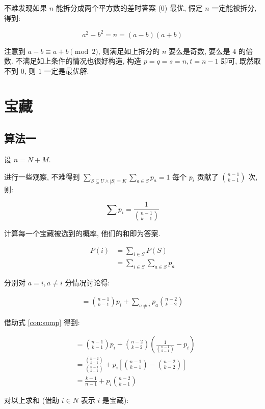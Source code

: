 \documentclass[a4paper, 12pt]{ctexart}
\begin{document}
不难发现如果 $n$ 能拆分成两个平方数的差时答案 ($0$) 最优, 假定 $n$ 一定能被拆分, 得到:

$$
a^2 - b^2 = n = (a - b)(a + b)
$$

注意到 $a - b \equiv a + b \pmod 2$, 则满足如上拆分的 $n$ 要么是奇数, 要么是 $4$ 的倍数.
不满足如上条件的情况也很好构造, 构造 $p = q = s = n, t = n - 1$ 即可, 既然取不到 $0$, 则 $1$ 一定是最优解.

\section{宝藏}

\subsection{算法一}

设 $n = N + M$.

进行一些观察, 不难得到 $\sum_{S \subseteq U \wedge |S| = K}\sum_{a\in S }p_a=1$ 每个 $p_i$ 贡献了 $\binom{n - 1}{k - 1}$ 次, 则:

\begin{equation}
    \sum p_i = \frac{1}{\binom{n - 1}{k - 1}} \label{con:sump}
\end{equation}

计算每一个宝藏被选到的概率, 他们的和即为答案.

\begin{align}
    P(i) &= \sum_{i \in S} P(S) \\
    &= \sum_{i \in S} \sum_{a \in S} p_a
\end{align}

分别对 $a = i, a \neq i$ 分情况讨论得:

\begin{align}
    = \binom{n - 1}{k - 1}p_i + \sum_{a \neq i} p_a \binom{n - 2}{k - 2}
\end{align}

借助式 \eqref{con:sump} 得到:

\begin{align}
    &= \binom{n - 1}{k - 1}p_i + \binom{n - 2}{k - 2}\left(\frac{1}{\binom{n - 1}{k - 1}} - p_i\right)\\
    &= \frac{\binom{n - 2}{k - 1}}{\binom{n - 1}{k - 1}} + p_i\left[\binom{n - 1}{k - 1} - \binom{n - 2}{k - 2}\right]\\
    &= \frac{k - 1}{n - 1} + p_i \binom{n - 2}{k - 1}
\end{align}

对以上求和 (借助 $i \in N$ 表示 $i$ 是宝藏):
\end{document}
